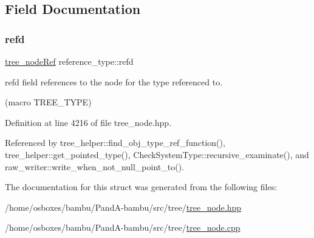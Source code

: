 \subsection{Field Documentation}
\mbox{\label{structreference__type_ab117e53579dab500e46fa6fb799e40f9}} 
\subsubsection{\texorpdfstring{refd}{refd}}
{\footnotesize\ttfamily \hyperlink{tree__node_8hpp_a6ee377554d1c4871ad66a337eaa67fd5}{tree\+\_\+node\+Ref} reference\+\_\+type\+::refd}



refd field references to the node for the type referenced to. 

(macro T\+R\+E\+E\+\_\+\+T\+Y\+PE) 

Definition at line 4216 of file tree\+\_\+node.\+hpp.



Referenced by tree\+\_\+helper\+::find\+\_\+obj\+\_\+type\+\_\+ref\+\_\+function(), tree\+\_\+helper\+::get\+\_\+pointed\+\_\+type(), Check\+System\+Type\+::recursive\+\_\+examinate(), and raw\+\_\+writer\+::write\+\_\+when\+\_\+not\+\_\+null\+\_\+point\+\_\+to().



The documentation for this struct was generated from the following files\+:\begin{DoxyCompactItemize}
\item 
/home/osboxes/bambu/\+Pand\+A-\/bambu/src/tree/\hyperlink{tree__node_8hpp}{tree\+\_\+node.\+hpp}\item 
/home/osboxes/bambu/\+Pand\+A-\/bambu/src/tree/\hyperlink{tree__node_8cpp}{tree\+\_\+node.\+cpp}\end{DoxyCompactItemize}
